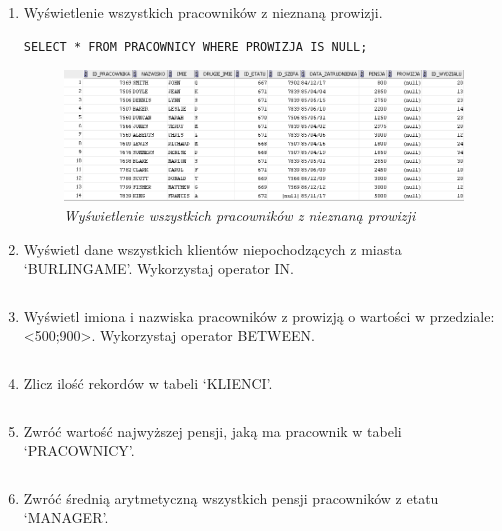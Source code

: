 \documentclass[a4paper, 10pt]{article}
\begin{document}
\begin{enumerate}
\item Wyświetlenie wszystkich pracowników z nieznaną prowizji.  
\begin{lstlisting}[style=SQL, caption=\textit{Wyświetlenie wszystkich pracowników z nieznaną prowizji}]
SELECT * FROM PRACOWNICY WHERE PROWIZJA IS NULL;
\end{lstlisting}

\begin{figure}[H]
	\centering
	\includegraphics[scale=0.7]{zadanie3.png}
	\caption{\textit{Wyświetlenie wszystkich pracowników z nieznaną prowizji}}
\end{figure}


\item Wyświetl dane wszystkich klientów niepochodzących z miasta `BURLINGAME'. Wykorzystaj operator IN. 
\begin{lstlisting}[style=SQL]
\end{lstlisting}


\item Wyświetl imiona i nazwiska pracowników z prowizją o wartości w przedziale: <500;900>. Wykorzystaj operator BETWEEN. 
\begin{lstlisting}[style=SQL]
\end{lstlisting}


\item Zlicz ilość rekordów w tabeli `KLIENCI'. 
\begin{lstlisting}[style=SQL]
\end{lstlisting}


\item  Zwróć wartość najwyższej pensji, jaką ma pracownik w tabeli `PRACOWNICY'.  
\begin{lstlisting}[style=SQL]
\end{lstlisting}


\item Zwróć średnią arytmetyczną wszystkich pensji pracowników z etatu `MANAGER'.  
\begin{lstlisting}[style=SQL]
\end{lstlisting}



\end{enumerate}
\end{document}
